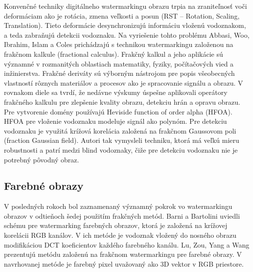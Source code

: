 Konvenčné techniky digitálneho watermarkingu obrazu trpia na zraniteľnosť voči deformáciam ako je rotácia, zmena veľkosti a posun (RST – Rotation, Scaling, Translation). Tieto deformácie desynchronizujú informáciu vloženú vodoznakom, a teda zabraňujú detekcii vodoznaku. Na vyriešenie tohto problému Abbasi, Woo, Ibrahim, Islam a Coles \cite{Abbasi2015} prichádzajú s technikou watermarkingu založenou na frakčnom kalkule (fractional calculus). Frakčný kalkul a jeho aplikácie sú významné v rozmanitých oblastiach matematiky, fyziky, počítačových vied a inžinierstva. Frakčné deriváty sú výborným nástrojom pre popis všeobecných vlastností rôznych materiálov a procesov ako je spracovanie signálu a obrazu. V rovnakom diele sa tvrdí, že nedávne výskumy úspešne aplikovali operátory frakčného kalkulu pre zlepšenie kvality obrazu, detekciu hrán a opravu obrazu. Pre vytvorenie domény používajú Heviside function of order alpha (HFOA). HFOA pre vloženie vodoznaku modeluje signál ako polynóm. Pre detekciu vodoznaku je využitá krížová korelácia založená na frakčnom Gaussovom poli (fraction Gaussian field). Autori tak vymysleli techniku, ktorá má veľkú mieru robustnosti a patrí medzi blind vodoznaky, čiže pre detekciu vodoznaku nie je potrebný pôvodný obraz.

\subsection{Farebné obrazy}
V posledných rokoch bol zaznamenaný významný pokrok vo watermarkingu obrazov v odtieňoch šedej použitím frakčných metód. Barni a Bartolini \cite{Barni} uviedli schému pre watermarking farebných obrazov, ktorá je založená na krížovej korelácii RGB kanálov. V ich metóde je vodoznak vložený do nosného obrazu modifikáciou DCT koeficientov každého farebného kanálu. Lu, Zou, Yang a Wang \cite{Lu-fractal} prezentujú metódu založenú na frakčnom watermarkingu pre farebné obrazy. V navrhovanej metóde je farebný pixel uvažovaný ako 3D vektor v RGB priestore.

